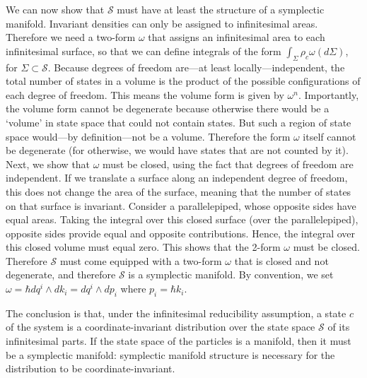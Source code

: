 \documentclass[letterpaper]{article}
\begin{document}
We can now show that $\mathcal{S}$ must have at least the structure of a symplectic manifold. Invariant densities can only be assigned to infinitesimal areas. Therefore we need a two-form $\omega$ that assigns an infinitesimal area to each infinitesimal surface, so that we can define integrals of the form $\int_{\Sigma} \rho_c \omega(d\Sigma)$, for $\Sigma \subset \mathcal{S}$. Because degrees of freedom are---at least locally---independent, the total number of states in a volume is the product of the possible configurations of each degree of freedom. This means the volume form is given by $\omega^n$. Importantly, the volume form cannot be degenerate because otherwise there would be a `volume' in state space that could not contain states. But such a region of state space would---by definition---not be a volume. Therefore the form $\omega$ itself cannot be degenerate (for otherwise, we would have states that are not counted by it). Next, we show that $\omega$ must be closed, using the fact that degrees of freedom are independent. If we translate a surface along an independent degree of freedom, this does not change the area of the surface, meaning that the number of states on that surface is invariant. Consider a parallelepiped, whose opposite sides have equal areas. Taking the integral over this closed surface (over the parallelepiped), opposite sides provide equal and opposite contributions. Hence, the integral over this closed volume must equal zero. This shows that the 2-form $\omega$ must be closed. Therefore $\mathcal{S}$ must come equipped with a two-form $\omega$ that is closed and not degenerate, and therefore $\mathcal{S}$ is a symplectic manifold. By convention, we set $\omega = \hbar dq^i \wedge dk_i = dq^i \wedge dp_i$ where $p_i = \hbar k_i$.

%

The conclusion is that, under the infinitesimal reducibility assumption, a state $c$ of the system is a coordinate-invariant distribution over the state space $\mathcal{S}$ of its infinitesimal parts. If the state space of the particles is a manifold, then it must be a symplectic manifold: symplectic manifold structure is necessary for the distribution to be coordinate-invariant. 
\end{document}
